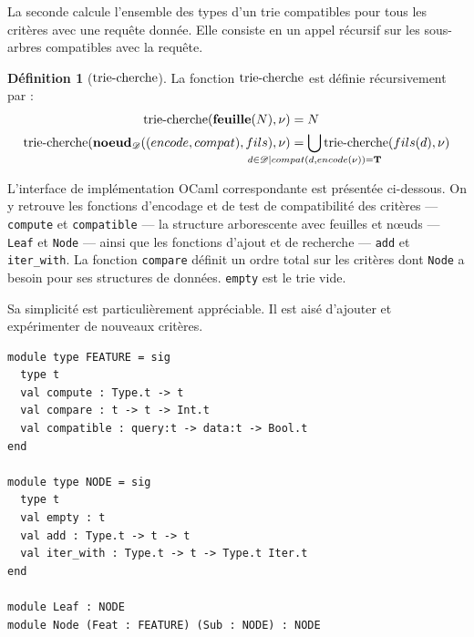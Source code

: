 \documentclass[a4paper]{report}
\theoremstyle{definition}
\newtheorem{definition}[theoreme]{Définition}
\newcommand{\mathhyphen}{{\hbox{-}}}
\begin{document}
La seconde calcule l'ensemble des types d'un trie compatibles pour tous les critères avec une requête donnée. Elle consiste en un appel récursif sur les sous-arbres compatibles avec la requête.

\begin{definition}[$\mathrm{trie\mathhyphen cherche}$]
  La fonction $\mathrm{trie\mathhyphen cherche}$ est définie récursivement par :
  \begin{align*}
      \mathrm{trie\mathhyphen cherche} (\bold{feuille} (N), \nu) &=
      N
    \\
      \mathrm{trie\mathhyphen cherche} (\bold{noeud}_\mathscr{D} ((encode, compat), fils), \nu) &=
      \bigcup_{\mathclap{{d \in \mathscr{D} \mid compat (d, encode (\nu)) = \bold{T}}}} \mathrm{trie\mathhyphen cherche} (fils (d), \nu)
  \end{align*}
\end{definition}

L'interface de implémentation OCaml correspondante est présentée ci-dessous. On y retrouve les fonctions d'encodage et de test de compatibilité des critères — \texttt{compute} et \texttt{compatible} — la structure arborescente avec feuilles et nœuds — \texttt{Leaf} et \texttt{Node} — ainsi que les fonctions d'ajout et de recherche — \texttt{add} et \texttt{iter_with}. La fonction \texttt{compare} définit un ordre total sur les critères dont \texttt{Node} a besoin pour ses structures de données. \texttt{empty} est le trie vide.

Sa simplicité est particulièrement appréciable. Il est aisé d'ajouter et expérimenter de nouveaux critères.

\begin{verbatim}
module type FEATURE = sig
  type t
  val compute : Type.t -> t
  val compare : t -> t -> Int.t
  val compatible : query:t -> data:t -> Bool.t
end

module type NODE = sig
  type t
  val empty : t
  val add : Type.t -> t -> t
  val iter_with : Type.t -> t -> Type.t Iter.t
end

module Leaf : NODE
module Node (Feat : FEATURE) (Sub : NODE) : NODE
\end{verbatim}

\end{document}
